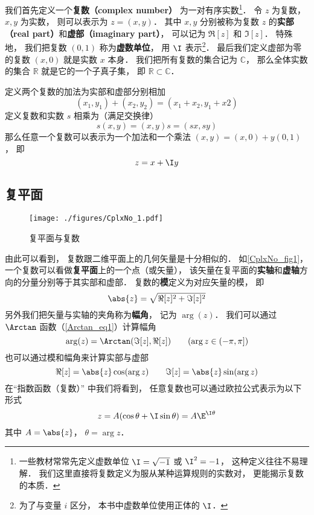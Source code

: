 

我们首先定义一个\textbf{复数（complex number）} 为一对有序实数\footnote{一些教材常常先定义虚数单位 $\I = \sqrt{-1}$ 或 $\I^2 = -1$， 这种定义往往不易理解． 我们这里直接将复数定义为服从某种运算规则的实数对， 更能揭示复数的本质．}． 令 $z$ 为复数， $x, y$ 为实数， 则可以表示为 $z = (x, y)$． 其中 $x,y$ 分别被称为复数 $z$ 的\textbf{实部（real part）}和\textbf{虚部（imaginary part）}， 可以记为 $\Re[z]$ 和 $\Im[z]$． 特殊地， 我们把复数 $(0, 1)$ 称为\textbf{虚数单位}， 用 $\I$ 表示\footnote{为了与变量 $i$ 区分， 本书中虚数单位使用正体的 $\I$．}． 最后我们定义虚部为零的复数 $(x, 0)$ 就是实数 $x$ 本身． 我们把所有复数的集合记为 $\mathbb C$， 那么全体实数的集合 $\mathbb R$ 就是它的一个子真子集， 即 $\mathbb R \subset \mathbb C$．

定义两个复数的加法为实部和虚部分别相加
\begin{equation}\label{CplxNo_eq1}
(x_1, y_1) + (x_2, y_2) = (x_1+ x_2, y_1 + x2)
\end{equation}
定义复数和实数 $s$ 相乘为（满足交换律）
\begin{equation}
s(x, y) = (x, y)s = (sx, sy)
\end{equation}
那么任意一个复数可以表示为一个加法和一个乘法 $(x, y) = (x, 0) + y(0, 1)$， 即
\begin{equation}
z = x + \I y
\end{equation}

\subsection{复平面}
\begin{figure}[ht]
\centering
\texttt{[image: ./figures/CplxNo\_1.pdf]}
\caption{复平面与复数} \label{CplxNo_fig1}
\end{figure}

由此可以看到， 复数跟二维平面上的几何矢量是十分相似的． 如\autoref{CplxNo_fig1}， 一个复数可以看做\textbf{复平面}上的一个点（或矢量）， 该矢量在复平面的\textbf{实轴}和\textbf{虚轴}方向的分量分别等于其实部和虚部． 复数的\textbf{模}定义为对应矢量的模， 即
\begin{equation}
\abs{z} = \sqrt{\Re[z]^2 + \Im[z]^2}
\end{equation}
另外我们把矢量与实轴的夹角称为\textbf{幅角}， 记为 $\arg(z)$． 我们可以通过 $\Arctan$ 函数（\autoref{Arctan_eq1}）计算幅角
\begin{equation}
\arg(z) = \Arctan(\Im[z], \Re[z])
\qquad (\arg z \in (-\pi, \pi])
\end{equation}
也可以通过模和幅角来计算实部与虚部
\begin{equation}
\Re[z] = \abs{z}\cos(\arg z) \qquad \Im[z] = \abs{z}\sin(\arg z)
\end{equation}
在“指数函数（复数）” 中我们将看到， 任意复数也可以通过欧拉公式表示为以下形式
\begin{equation}
z = A(\cos\theta + \I\sin\theta) = A\E^{\I\theta}
\end{equation}
其中 $A = \abs{z}$， $\theta = \arg z$．

